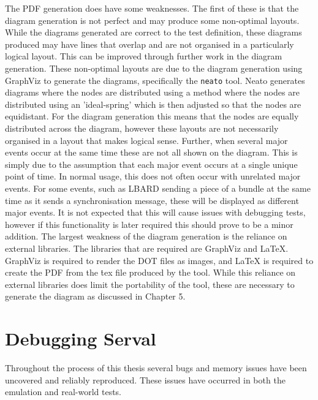 The PDF generation does have some weaknesses.
The first of these is that the diagram generation is not perfect and may produce some non-optimal layouts.
While the diagrams generated are correct to the test definition, these diagrams produced may have lines that overlap and are not organised in a particularly logical layout.
This can be improved through further work in the diagram generation. 
These non-optimal layouts are due to the diagram generation using GraphViz to generate the diagrams, specifically the \texttt{neato} tool.
Neato generates diagrams where the nodes are distributed using a method where the nodes are distributed using an 'ideal-spring' which is then adjusted so that the nodes are equidistant. 
For the diagram generation this means that the nodes are equally distributed across the diagram, however these layouts are not necessarily organised in a layout that makes logical sense.
Further, when several major events occur at the same time these are not all shown on the diagram.
This is simply due to the assumption that each major event occurs at a single unique point of time.
In normal usage, this does not often occur with unrelated major events.
For some events, such as LBARD sending a piece of a bundle at the same time as it sends a synchronisation message, these will be displayed as different major events.
It is not expected that this will cause issues with debugging tests, however if this functionality is later required this should prove to be a minor addition.
The largest weakness of the diagram generation is the reliance on external libraries.
The libraries that are required are GraphViz and LaTeX.
GraphViz is required to render the DOT files as images, and LaTeX is required to create the PDF from the \.tex file produced by the tool.
While this reliance on external libraries does limit the portability of the tool, these are necessary to generate the diagram as discussed in Chapter 5.


\section{Debugging Serval}
Throughout the process of this thesis several bugs and memory issues have been uncovered and reliably reproduced.
These issues have occurred in both the emulation and real-world tests.

